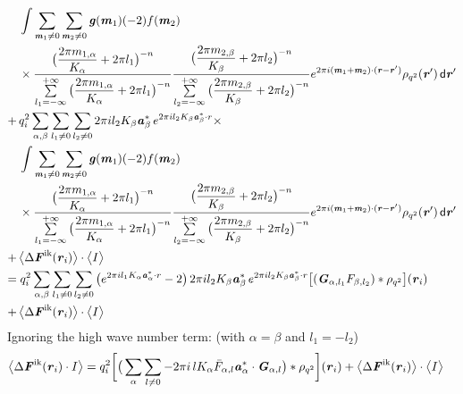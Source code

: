 \documentclass[aps,pre,preprint]{revtex4}
\renewcommand{\v}[1]{\textbf{\textit{#1}}}
\renewcommand{\d}[1]{\textsf{#1}}
\begin{document}
\begin{align}
  &\,
  \int
  \sum_{\v m_1\neq 0}\sum_{\v m_2\neq 0}
  \v g(\v m_1) (-2) f(\v m_2) \\\nonumber
  &\,\times
  \frac
  {\big(\dfrac{2\pi m_{1,\alpha}}{K_\alpha} + 2\pi l_1\big)^{-n}}
  {\sum\limits_{l_1=-\infty}^{+\infty}
    \big(\dfrac{2\pi m_{1,\alpha}}{K_\alpha} + 2\pi l_1\big)^{-n}}
  \frac
  {\big(\dfrac{2\pi m_{2,\beta}}{K_\beta} + 2\pi l_2\big)^{-n}}
  {\sum\limits_{l_2=-\infty}^{+\infty}
    \big(\dfrac{2\pi m_{2,\beta}}{K_\beta} + 2\pi l_2\big)^{-n}}
  e^{2\pi i(\v m_1+\v m_2)\cdot(\v r - \v r')} \rho_{q^2}(\v r') \,\d d\v r' \\\nonumber
  +&\,
  q^2_i
  \sum_{\alpha, \beta}\sum_{l_1\neq 0}\sum_{l_2\neq 0}
  2\pi i l_2K_\beta \v a_\beta ^\ast\,e^{2\pi i l_2 K_\beta \v a_\beta^\ast\cdot r} \times \\\nonumber
  &\,
  \int
  \sum_{\v m_1\neq 0}\sum_{\v m_2\neq 0}
  \v g(\v m_1) (-2) f(\v m_2) \\\nonumber
  &\,\times
  \frac
  {\big(\dfrac{2\pi m_{1,\alpha}}{K_\alpha} + 2\pi l_1\big)^{-n}}
  {\sum\limits_{l_1=-\infty}^{+\infty}
    \big(\dfrac{2\pi m_{1,\alpha}}{K_\alpha} + 2\pi l_1\big)^{-n}}
  \frac
  {\big(\dfrac{2\pi m_{2,\beta}}{K_\beta} + 2\pi l_2\big)^{-n}}
  {\sum\limits_{l_2=-\infty}^{+\infty}
    \big(\dfrac{2\pi m_{2,\beta}}{K_\beta} + 2\pi l_2\big)^{-n}}
  e^{2\pi i(\v m_1+\v m_2)\cdot(\v r - \v r')} \rho_{q^2}(\v r') \,\d d\v r' \\ \nonumber
  + &\,
  \big\langle
  \Delta\v F^{\textrm{ik}}(\v r_i)
  \big\rangle
  \cdot 
  \big\langle
  I
  \big\rangle   \\\nonumber
  =&\;
  q^2_i
  \sum_{\alpha, \beta}\sum_{l_1\neq 0}\sum_{l_2\neq 0}
  \big(
  e^{2\pi i l_1 K_\alpha\v a_\alpha^\ast\cdot r} - 2
  \big)\,
  2\pi i l_2K_\beta \v a_\beta ^\ast
  \,e^{2\pi i l_2 K_\beta \v a_\beta^\ast\cdot r}
  \big[
  (\v G_{\alpha,l_1} F_{\beta,l_2}) \ast \rho_{q^2}
  \big] (\v r_i) \\
  + &\,
  \big\langle
  \Delta\v F^{\textrm{ik}}(\v r_i)
  \big\rangle
  \cdot 
  \big\langle
  I
  \big\rangle   
\end{align}
Ignoring the high wave number term: (with $\alpha = \beta$ and $l_1 = -l_2$)
\begin{align}
  \big\langle
  \Delta\v F^{\textrm{ik}}(\v r_i)\cdot I
  \big\rangle
  =&\;
  q^2_i
  \bigg[
  \big(
  \sum_{\alpha}\sum_{l\neq 0}
  -2\pi i\,l K_\alpha \bar F_{\alpha,l}\v a_\alpha ^\ast\cdot\v G_{\alpha,l} 
  \big)\ast \rho_{q^2}
  \bigg] (\v r_i) +
  \big\langle
  \Delta\v F^{\textrm{ik}}(\v r_i)
  \big\rangle
  \cdot 
  \big\langle
  I
  \big\rangle   
\end{align}
\end{document}
